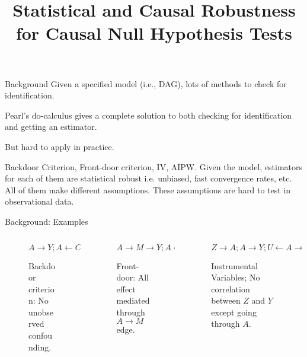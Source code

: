 \documentclass{beamer}
\begin{document}
\title[]{Statistical and Causal Robustness for Causal Null Hypothesis Tests}
\date{}

\maketitle

\begin{frame}{Background}
	Given a specified model (i.e., DAG), lots of methods to check for identification.

	Pearl's do-calculus gives a complete solution to both checking for identification and getting an estimator.

	But hard to apply in practice.
	

	Backdoor Criterion, Front-door criterion, IV, AIPW. Given the model, estimators for each of them are statistical robust i.e. unbiased, fast convergence rates, etc.
	All of them make different assumptions.
	These assumptions are hard to test in observational data.
\end{frame}

\begin{frame}{Background: Examples}
	\begin{columns}
		\begin{column}{0.33 \textwidth}
			\center
			\begin{figure}
				$ A \rightarrow Y; A \leftarrow C \rightarrow Y $
				\caption{Backdoor criterion: No unobserved confounding.}
			\end{figure}
		\end{column}
		\begin{column}{0.33 \textwidth}
			\center
			\begin{figure}
				$ A \rightarrow M \rightarrow Y; A \leftarrow U \rightarrow Y  $
				\caption{Front-door: All effect mediated through $ A \rightarrow M $ edge.}
			\end{figure}
		\end{column}
		\begin{column}{0.33 \textwidth}
			\center
			\begin{figure}
				$ Z \rightarrow A; A \rightarrow Y; U \leftarrow A \rightarrow Y $
				\caption{Instrumental Variables; No correlation between $ Z $ and $ Y $ except going through $ A $.}
			\end{figure}
		\end{column}
	\end{columns}
\end{frame}
\end{document}
